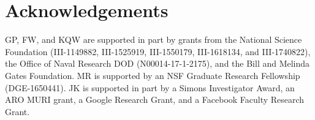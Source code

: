 \documentclass{article}
\title{\titl}
\author{\authorinfo}
\begin{document}
\maketitle
\setcounter{footnote}{0}

\begin{abstract}
  
\end{abstract}











%

%







\section*{Acknowledgements}
GP, FW, and KQW are supported in part by grants from the National Science Foundation
(III-1149882, III-1525919, III-1550179, III-1618134, and III-1740822),
the Office of Naval Research DOD (N00014-17-1-2175),
and the Bill and Melinda Gates Foundation.
MR is supported by an NSF Graduate Research Fellowship (DGE-1650441).
JK is supported in part by a Simons Investigator Award, an ARO MURI grant, a
Google Research Grant, and a Facebook Faculty Research Grant.

{\footnotesize
  
  
}

%
%


\clearpage


\makeatletter
  \setcounter{table}{0}
  \renewcommand{\thetable}{S\arabic{table}}%
  \setcounter{figure}{0}
  \renewcommand{\thefigure}{S\arabic{figure}}%
  \setcounter{section}{0}
  \renewcommand{\thesection}{S\arabic{section}}
  \renewcommand{\thesubsection}{\thesection.\arabic{subsection}}
  \setcounter{equation}{0}
  \renewcommand\theequation{S\arabic{equation}}
  \renewcommand{\bibnumfmt}[1]{[S#1]}
\end{document}
